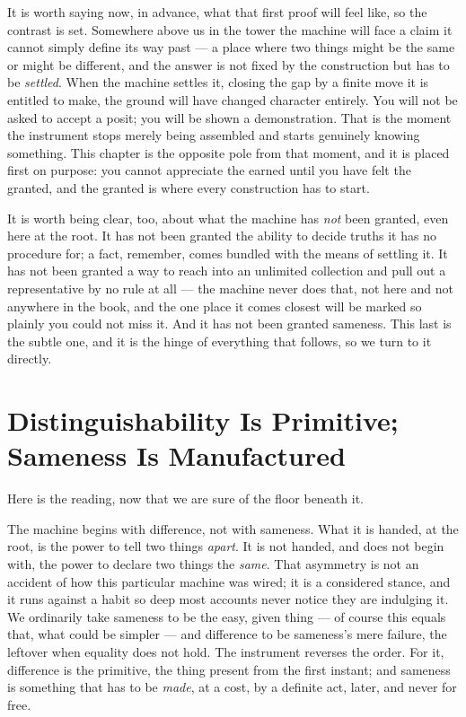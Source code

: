 It is worth saying now, in advance, what that first proof will feel like, so the contrast is set. Somewhere above
us in the tower the machine will face a claim it cannot simply define its way past --- a place where two things
might be the same or might be different, and the answer is not fixed by the construction but has to be
\emph{settled}. When the machine settles it, closing the gap by a finite move it is entitled to make, the ground
will have changed character entirely. You will not be asked to accept a posit; you will be shown a demonstration.
That is the moment the instrument stops merely being assembled and starts genuinely knowing something. This
chapter is the opposite pole from that moment, and it is placed first on purpose: you cannot appreciate the
earned until you have felt the granted, and the granted is where every construction has to start.

It is worth being clear, too, about what the machine has \emph{not} been granted, even here at the root. It has
not been granted the ability to decide truths it has no procedure for; a fact, remember, comes bundled with the
means of settling it. It has not been granted a way to reach into an unlimited collection and pull out a
representative by no rule at all --- the machine never does that, not here and not anywhere in the book, and the
one place it comes closest will be marked so plainly you could not miss it. And it has not been granted sameness.
This last is the subtle one, and it is the hinge of everything that follows, so we turn to it directly.

\section{Distinguishability Is Primitive; Sameness Is Manufactured}

Here is the reading, now that we are sure of the floor beneath it.

The machine begins with difference, not with sameness. What it is handed, at the root, is the power to tell two
things \emph{apart}. It is not handed, and does not begin with, the power to declare two things the \emph{same}.
That asymmetry is not an accident of how this particular machine was wired; it is a considered stance, and it
runs against a habit so deep most accounts never notice they are indulging it. We ordinarily take sameness to be
the easy, given thing --- of course this equals that, what could be simpler --- and difference to be sameness's
mere failure, the leftover when equality does not hold. The instrument reverses the order. For it, difference is
the primitive, the thing present from the first instant; and sameness is something that has to be \emph{made}, at
a cost, by a definite act, later, and never for free.

